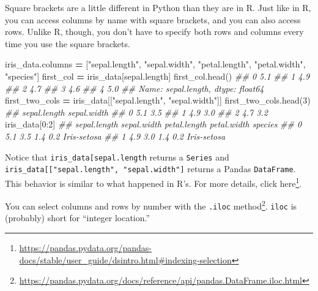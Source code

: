 \documentclass[
  12pt,
  krantz2]{krantz}
\makeatletter
\newenvironment{Shaded}{\begin{snugshade}}{\end{snugshade}}
\newcommand{\CommentTok}[1]{\textcolor[rgb]{0.37,0.37,0.37}{\textit{#1}}}
\newcommand{\DecValTok}[1]{\textcolor[rgb]{0.06,0.06,0.06}{#1}}
\newcommand{\NormalTok}[1]{#1}
\newcommand{\OperatorTok}[1]{\textcolor[rgb]{0.43,0.43,0.43}{\textbf{#1}}}
\newcommand{\StringTok}[1]{\textcolor[rgb]{0.5,0.5,0.5}{#1}}
\renewcommand{\href}[2]{#2\footnote{\url{#1}}}
\newenvironment{kframe}{%
\medskip{}
\setlength{\fboxsep}{.8em}
 \def\at@end@of@kframe{}%
 \ifinner\ifhmode%
  \def\at@end@of@kframe{\end{minipage}}%
  \begin{minipage}{\columnwidth}%
 \fi\fi%
 \def\FrameCommand##1{\hskip\@totalleftmargin \hskip-\fboxsep
 \colorbox{shadecolor}{##1}\hskip-\fboxsep
     \hskip-\linewidth \hskip-\@totalleftmargin \hskip\columnwidth}%
 \MakeFramed {\advance\hsize-\width
   \@totalleftmargin\z@ \linewidth\hsize
   \@setminipage}}%
 {\par\unskip\endMakeFramed%
 \at@end@of@kframe}
\renewenvironment{Shaded}{\begin{kframe}}{\end{kframe}}
\makeatother
\begin{document}
Square brackets are a little different in Python than they are in R. Just like in R, you can access columns by name with square brackets, and you can also access rows. Unlike R, though, you don't have to specify both rows and columns every time you use the square brackets.

\begin{Shaded}
\begin{Highlighting}[]
\NormalTok{iris\_data.columns }\OperatorTok{=}\NormalTok{ [}\StringTok{"sepal.length"}\NormalTok{, }\StringTok{"sepal.width"}\NormalTok{, }
                     \StringTok{"petal.length"}\NormalTok{, }\StringTok{"petal.width"}\NormalTok{, }
                     \StringTok{"species"}\NormalTok{]}
\NormalTok{first\_col }\OperatorTok{=}\NormalTok{ iris\_data[}\StringTok{\textquotesingle{}sepal.length\textquotesingle{}}\NormalTok{]}
\NormalTok{first\_col.head()}
\CommentTok{\#\# 0    5.1}
\CommentTok{\#\# 1    4.9}
\CommentTok{\#\# 2    4.7}
\CommentTok{\#\# 3    4.6}
\CommentTok{\#\# 4    5.0}
\CommentTok{\#\# Name: sepal.length, dtype: float64}
\NormalTok{first\_two\_cols }\OperatorTok{=}\NormalTok{ iris\_data[[}\StringTok{"sepal.length"}\NormalTok{, }\StringTok{"sepal.width"}\NormalTok{]]}
\NormalTok{first\_two\_cols.head(}\DecValTok{3}\NormalTok{)}
\CommentTok{\#\#    sepal.length  sepal.width}
\CommentTok{\#\# 0           5.1          3.5}
\CommentTok{\#\# 1           4.9          3.0}
\CommentTok{\#\# 2           4.7          3.2}
\NormalTok{iris\_data[}\DecValTok{0}\NormalTok{:}\DecValTok{2}\NormalTok{]}
\CommentTok{\#\#    sepal.length  sepal.width  petal.length  petal.width      species}
\CommentTok{\#\# 0           5.1          3.5           1.4          0.2  Iris{-}setosa}
\CommentTok{\#\# 1           4.9          3.0           1.4          0.2  Iris{-}setosa}
\end{Highlighting}
\end{Shaded}

Notice that \texttt{iris\_data{[}\textquotesingle{}sepal.length\textquotesingle{}{]}} returns a \texttt{Series} and \texttt{iris\_data{[}{[}"sepal.length",\ "sepal.width"{]}} returns a Pandas \texttt{DataFrame}. This behavior is similar to what happened in R's. For more details, click \href{https://pandas.pydata.org/pandas-docs/stable/user_guide/dsintro.html\#indexing-selection}{here}.

You can select columns and rows by number with the \href{https://pandas.pydata.org/docs/reference/api/pandas.DataFrame.iloc.html}{\texttt{.iloc} method}. \texttt{iloc} is (probably) short for ``integer location.''
\end{document}
